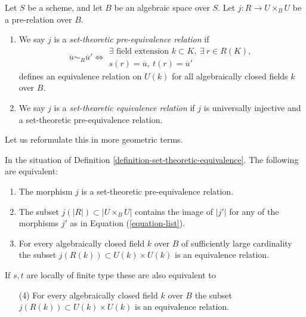 \begin{definition}
\label{definition-set-theoretic-equivalence}
Let $S$ be a scheme, and let $B$ be an algebraic space over $S$.
Let $j : R \to U \times_B U$ be a pre-relation over $B$.
\begin{enumerate}
\item We say $j$ is a {\it set-theoretic pre-equivalence relation} if
$$
\overline{u} \sim_R \overline{u}'
\Leftrightarrow
\begin{matrix}
\exists\text{ field extension }k \subset K, \ \exists\ r \in R(K),\\
s(r) = \overline{u}, \ t(r) = \overline{u}'
\end{matrix}
$$
defines an equivalence relation on $U(k)$ for all algebraically closed fields
$k$ over $B$.
\item We say $j$ is a {\it set-theoretic equivalence relation}
if $j$ is universally injective and a set-theoretic pre-equivalence
relation.
\end{enumerate}
\end{definition}

\noindent
Let us reformulate this in more geometric terms.

\begin{lemma}
\label{lemma-set-theoretic-equivalence-geometric}
In the situation of Definition \ref{definition-set-theoretic-equivalence}.
The following are equivalent:
\begin{enumerate}
\item The morphism $j$ is a set-theoretic pre-equivalence relation.
\item The subset $j(|R|) \subset |U \times_B U|$ contains the image of
$|j'|$ for any of the morphisms $j'$ as in Equation (\ref{equation-list}).
\item For every algebraically closed field $k$ over $B$ of sufficiently large
cardinality the subset $j(R(k)) \subset U(k) \times U(k)$ is an equivalence
relation.
\end{enumerate}
If $s, t$ are locally of finite type these are also equivalent to
\begin{enumerate}
\item[(4)] For every algebraically closed field $k$ over $B$
the subset $j(R(k)) \subset U(k) \times U(k)$ is an equivalence relation.
\end{enumerate}
\end{lemma}

